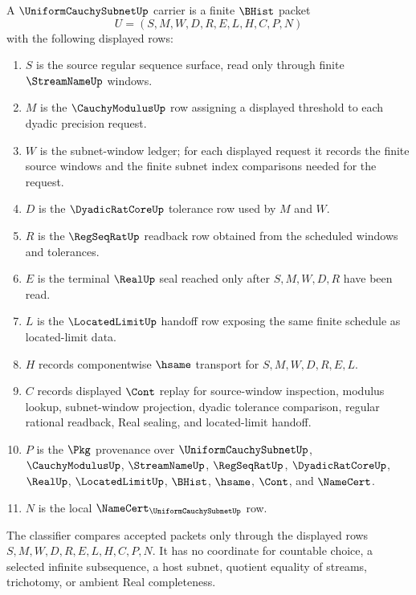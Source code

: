 \begin{definition}
\label{def:uniform-cauchy-subnet-carrier}
A $\UniformCauchySubnetUp$ carrier is a finite $\BHist$ packet
$$
U=(S,M,W,D,R,E,L,H,C,P,N)
$$
with the following displayed rows:
\begin{enumerate}
\item $S$ is the source regular sequence surface, read only through finite $\StreamNameUp$ windows.
\item $M$ is the $\CauchyModulusUp$ row assigning a displayed threshold to each dyadic precision request.
\item $W$ is the subnet-window ledger; for each displayed request it records the finite source windows and the finite subnet index comparisons needed for the request.
\item $D$ is the $\DyadicRatCoreUp$ tolerance row used by $M$ and $W$.
\item $R$ is the $\RegSeqRatUp$ readback row obtained from the scheduled windows and tolerances.
\item $E$ is the terminal $\RealUp$ seal reached only after $S,M,W,D,R$ have been read.
\item $L$ is the $\LocatedLimitUp$ handoff row exposing the same finite schedule as located-limit data.
\item $H$ records componentwise $\hsame$ transport for $S,M,W,D,R,E,L$.
\item $C$ records displayed $\Cont$ replay for source-window inspection, modulus lookup, subnet-window projection, dyadic tolerance comparison, regular rational readback, Real sealing, and located-limit handoff.
\item $P$ is the $\Pkg$ provenance over $\UniformCauchySubnetUp$, $\CauchyModulusUp$, $\StreamNameUp$, $\RegSeqRatUp$, $\DyadicRatCoreUp$, $\RealUp$, $\LocatedLimitUp$, $\BHist$, $\hsame$, $\Cont$, and $\NameCert$.
\item $N$ is the local $\NameCert_{\UniformCauchySubnetUp}$ row.
\end{enumerate}
The classifier compares accepted packets only through the displayed rows $S,M,W,D,R,E,L,H,C,P,N$. It has no coordinate for countable choice, a selected infinite subsequence, a host subnet, quotient equality of streams, trichotomy, or ambient Real completeness.
\end{definition}

